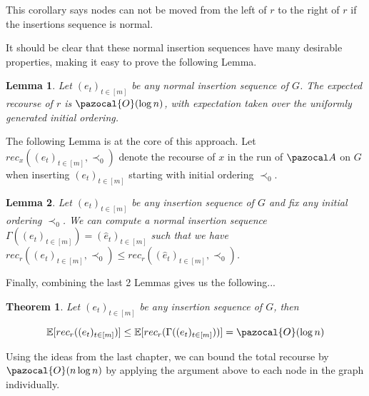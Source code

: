 \documentclass{article}
\newtheorem{theorem}{Theorem}
\newtheorem{lemma}{Lemma}
\begin{document}
This corollary says nodes can not be moved from the left of $r$ to the right of $r$ if the insertions sequence is normal.

It should be clear that these normal insertion sequences have many desirable properties, making it easy to prove the following Lemma.

\begin{lemma}
Let $(e_t)_{t \in [m]}$ be any normal insertion sequence of $G$. The expected recourse of $r$ is $\pazocal{O}(\log n)$, with expectation taken over the uniformly generated initial ordering.
\end{lemma}

The following Lemma is at the core of this approach. Let $rec_x((e_t)_{t \in [m]}, \prec_0)$ denote the recourse of $x$ in the run of $\pazocal A$ on $G$ when inserting $(e_t)_{t \in [m]}$ starting with initial ordering $\prec_0$.

\begin{lemma}
Let $(e_t)_{t \in [m]}$ be any insertion sequence of $G$ and fix any initial ordering $\prec_0$. We can compute a normal insertion sequence $\Gamma((e_t)_{t \in [m]}) = (\hat{e}_t)_{t \in [m]}$ such that we have $rec_r((e_t)_{t \in [m]}, \prec_0) \leq rec_r((\hat{e}_t)_{t \in [m]}, \prec_0)$.
\end{lemma}

Finally, combining the last 2 Lemmas gives us the following...

\begin{theorem}
Let $(e_t)_{t \in [m]}$ be any insertion sequence of $G$, then

\[ \mathbb{E}[ rec_r((e_t)_{t \in [m]})] \leq \mathbb{E}[ rec_r(\Gamma((e_t)_{t \in [m]}))] = \pazocal{O}(\log n) \]
\end{theorem}

Using the ideas from the last chapter, we can bound the total recourse by $\pazocal{O}(n \log n)$ by applying the argument above to each node in the graph individually.
\end{document}
